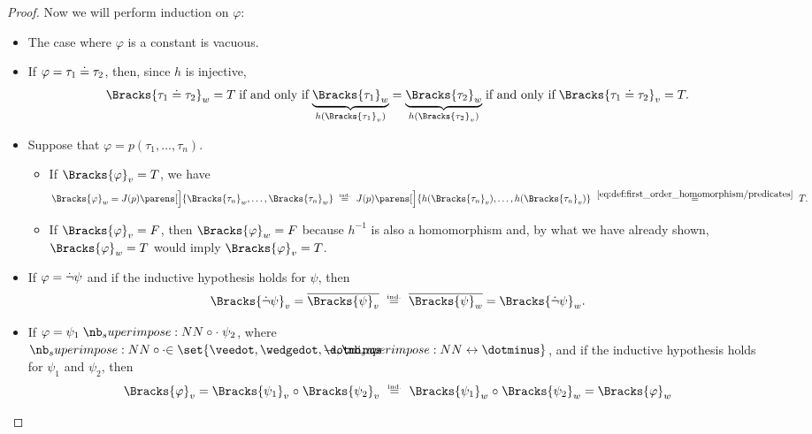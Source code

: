 \begin{proof}
  Now we will perform induction on \( \varphi \):
  \begin{itemize}
    \item The case where \( \varphi \) is a constant is vacuous.
    \item If \( \varphi = \tau_1 \doteq \tau_2 \), then, since \( h \) is injective,
    \begin{equation*}
      \Bracks{\tau_1 \syneq \tau_2}_w = T
      \T{if and only if}
      \underbrace{\Bracks{\tau_1}_w}_{h(\Bracks{\tau_1}_v)} = \underbrace{\Bracks{\tau_2}_w}_{h(\Bracks{\tau_2}_v)}
      \T{if and only if}
      \Bracks{\tau_1 \syneq \tau_2}_v = T.
    \end{equation*}

    \item Suppose that \( \varphi = p(\tau_1, \ldots, \tau_n) \).
    \begin{itemize}
      \item If \( \Bracks{\varphi}_v = T \), we have
      \begin{equation*}
        \Bracks{\varphi}_w
        =
        J(p)\parens[\Big]{ \Bracks{\tau_n}_w, \ldots, \Bracks{\tau_n}_w }
        \reloset {\T{ind.}} =
        J(p)\parens[\Big]{ h(\Bracks{\tau_n}_v), \ldots, h(\Bracks{\tau_n}_v) }
        \reloset {\eqref{eq:def:first_order_homomorphism/predicates}} =
        T.
      \end{equation*}

      \item If \( \Bracks{\varphi}_v = F \), then \( \Bracks{\varphi}_w = F \) because \( h^{-1} \) is also a homomorphism and, by what we have already shown, \( \Bracks{\varphi}_w = T \) would imply \( \Bracks{\varphi}_v = T \).
    \end{itemize}

    \item If \( \varphi = \dot\neg \psi \) and if the inductive hypothesis holds for \( \psi \), then
    \begin{equation*}
      \Bracks{\synneg \psi}_v
      =
      \oline{\Bracks{\psi}_v}
      \reloset {\T{ind.}} =
      \oline{\Bracks{\psi}_w}
      =
      \Bracks{\synneg \psi}_w.
    \end{equation*}

    \item If \( \varphi = \psi_1 \syncirc \psi_2 \), where \( \syncirc \in \set{ \synvee, \synwedge, \synimplies, \syniff } \), and if the inductive hypothesis holds for \( \psi_1 \) and \( \psi_2 \), then
    \begin{equation*}
      \Bracks{\varphi}_v
      =
      \Bracks{\psi_1}_v \relcirc \Bracks{\psi_2}_v
      \reloset {\T{ind.}} =
      \Bracks{\psi_1}_w \relcirc \Bracks{\psi_2}_w
      =
      \Bracks{\varphi}_w
    \end{equation*}


\end{itemize}
\end{proof}
